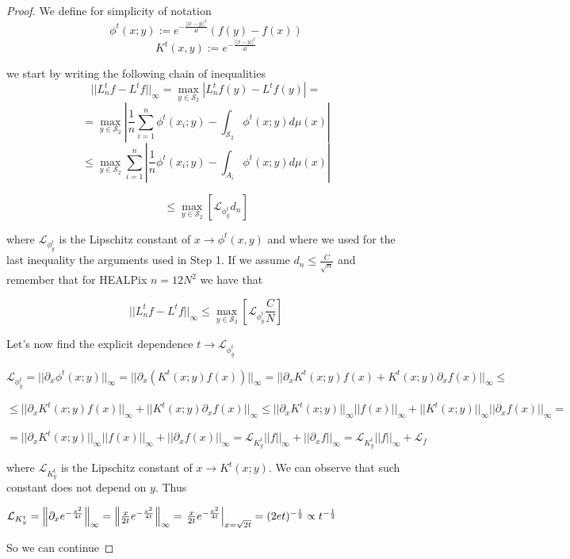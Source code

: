 \begin{proof}
	
	We define for simplicity of notation
	$$\phi^t(x;y) := e^{-\frac{||x-y||^2}{4t}}\left(f(y)-f(x)\right)$$
	$$K^t(x,y) :=  e^{-\frac{||x-y||^2}{4t}}$$

	
	we start by writing the following chain of inequalities
	$$||L_n^tf-L^tf||_\infty = \max _{y\in \mathcal S_2} \left|L_n^tf(y)-L^tf(y)\right|=$$
	$$= \max _{y\in \mathcal S_2} \left| \frac{1}{n} \sum_{i=1}^n \phi^t(x_i; y)- \int_{\mathcal S_2} \phi^t(x;y)d\mu(x) \right|$$
	$$\leq \max _{y\in \mathcal S_2}  \sum_{i=1}^n   \left| \frac{1}{n}  \phi^t(x_i; y)- \int_{A_i} \phi^t(x;y)d\mu(x) \right|$$

	$$\leq  \max _{y\in \mathcal S_2} \left[\mathcal L_{\phi^t_y}d_n \right]$$
	
	where $\mathcal L_{\phi^t_y}$ is the Lipschitz constant of $x \rightarrow \phi^t(x, y)$ and where we used for the last inequality the arguments used in Step 1. If we assume $d_n\leq \frac{C}{\sqrt{n}}$ and remember that for HEALPix $n=12N^2$ we have that
	
	$$||L_n^tf-L^tf||_\infty  \leq  \max _{y\in \mathcal S_2} \left[ \mathcal L_{\phi^t_y} \frac{C}{N} \right]$$
	
	Let's now find the explicit dependence $t\rightarrow \mathcal L_{\phi^t_y}$
	
	$\mathcal L_{\phi^t_y} = ||\partial_x\phi^t(x;y)||_\infty = ||\partial_x\left(K^t(x;y)f(x)\right)||_\infty = ||\partial_x K^t(x;y)f(x) + K^t(x;y)\partial_x f(x)||_\infty \leq$
	
	$ \leq ||\partial_x K^t(x;y)f(x)||_\infty + ||K^t(x;y)\partial_x f(x)||_\infty \leq  ||\partial_x K^t(x;y)||_\infty||f(x)||_\infty + ||K^t(x;y)||_\infty||\partial_x f(x)||_\infty = $
	
	$ = ||\partial_x K^t(x;y)||_\infty||f(x)||_\infty + ||\partial_x f(x)||_\infty = \mathcal L_{K^t_y} ||f||_\infty + ||\partial_xf||_\infty = \mathcal L_{K^t_y} ||f||_\infty + \mathcal L_f$
	
	where $\mathcal L_{K^t_y}$ is the Lipschitz constant of $x\rightarrow K^t(x;y)$. We can observe that such constant does not depend on $y$. Thus
	
	$\mathcal L_{K^t_y} = \left\lVert\partial_x e^{-\frac{x^2}{4t}}\right\rVert_\infty = \left\lVert\frac{x}{2t}e^{-\frac{x^2}{4t}}\right\rVert_\infty = \left. \frac{x}{2t}e^{-\frac{x^2}{4t}}\right|_{x=\sqrt{2t}}=(2et)^{-\frac{1}{2}}\propto t ^ {-\frac{1}{2}}$
	
	So we can continue
	

\end{proof}

